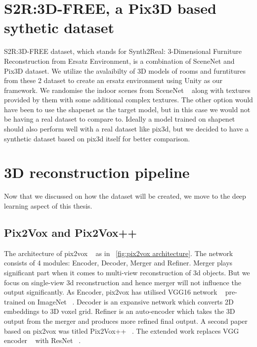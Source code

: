 \section{S2R:3D-FREE, a Pix3D based sythetic dataset}

S2R:3D-FREE dataset, which stands for Synth2Real: 3-Dimensional Furniture Reconstruction from Ersatz Environment, is a combination of SceneNet and Pix3D dataset.
We utilize the avalaibilty of 3D models of rooms and furntitures from these 2 dataset to create an ersatz environment using Unity as our framework.
We randomise the indoor scenes from SceneNet ~\cite{McCormac:etal:ICCV2017} along with textures provided by them with some additional complex textures.
The other option would have been to use the shapenet as the target model, but in this case we would not be having a real dataset to compare to.
Ideally a model trained on shapenet should also perform well with a real dataset like pix3d, but we decided to have a synthetic dataset based on pix3d itself for better comparison.


\section{3D reconstruction pipeline}\label{s:3D reconstruction pipeline}
Now that we discussed on how the dataset will be created, we move to the deep learning aspect of this thesis.

\subsection{Pix2Vox and Pix2Vox++}
The architecture of pix2vox ~\cite{Xie_2019} as in ~\ref{fig:pix2vox architecture}.
The network consists of 4 modules: Encoder, Decoder, Merger and Refiner.
Merger plays significant part when it comes to multi-view reconstruction of 3d objects.
But we focus on single-view 3d reconstruction and hence merger will not influence the output significantly.
As Encoder, pix2vox has utilised VGG16 network ~\cite{simonyan2015deep} pre-trained on ImageNet ~\cite{Deng2009ImageNetAL}.
Decoder is an expansive network which converts 2D embeddings to 3D voxel grid.
Refiner is an auto-encoder which takes the 3D output from the merger and produces more refined final output.
A second paper based on pix2vox was titled Pix2Vox++ ~\cite{Xie_2020}.
The extended work replaces VGG encoder ~\cite{simonyan2015deep} with ResNet ~\cite{He2016DeepRL}.

